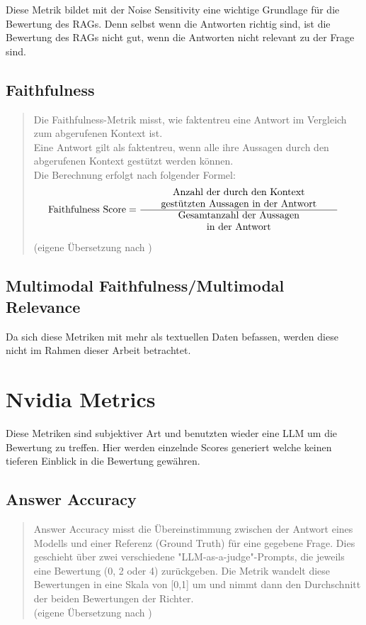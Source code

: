 Diese Metrik bildet mit der Noise Sensitivity eine wichtige Grundlage für die Bewertung des RAGs.
Denn selbst wenn die Antworten richtig sind, ist die Bewertung des RAGs nicht gut, wenn die Antworten nicht relevant zu der Frage sind.

\subsection{Faithfulness}
\begin{quote}
Die Faithfulness-Metrik misst, wie faktentreu eine Antwort im Vergleich zum abgerufenen Kontext ist.\\

Eine Antwort gilt als faktentreu, wenn alle ihre Aussagen durch den abgerufenen Kontext gestützt werden können.\\

Die Berechnung erfolgt nach folgender Formel:
\begin{align}
  \text{Faithfulness Score} 
    &= \frac{
        \parbox{7cm}{\centering Anzahl der durch den Kontext\\ gestützten Aussagen in der Antwort}
      }{
        \parbox{7cm}{\centering Gesamtanzahl der Aussagen\\ in der Antwort}
      }
  \end{align}

(eigene Übersetzung nach \cite{ragas_faithfulness})
\end{quote}
\subsection{Multimodal Faithfulness/Multimodal Relevance}
Da sich diese Metriken mit mehr als textuellen Daten befassen, werden diese nicht im Rahmen dieser Arbeit betrachtet.


\section{Nvidia Metrics}
Diese Metriken sind subjektiver Art und benutzten wieder eine LLM um die Bewertung zu treffen.
Hier werden einzelnde Scores generiert welche keinen tieferen Einblick in die Bewertung gewähren.

\subsection{Answer Accuracy}
\begin{quote}
Answer Accuracy misst die Übereinstimmung zwischen der Antwort eines Modells und einer Referenz (Ground Truth) für eine gegebene Frage. Dies geschieht über zwei verschiedene "LLM-as-a-judge"-Prompts, die jeweils eine Bewertung (0, 2 oder 4) zurückgeben. Die Metrik wandelt diese Bewertungen in eine Skala von [0,1] um und nimmt dann den Durchschnitt der beiden Bewertungen der Richter.
\\
(eigene Übersetzung nach \cite{ragas_nvidia_metrics})
\end{quote}

